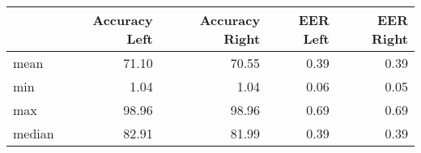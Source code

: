 \begin{tabular}{lrrrr}
\toprule
{} &  Accuracy Left &  Accuracy Right &  EER Left &  EER Right \\
\midrule
mean   &          71.10 &           70.55 &      0.39 &       0.39 \\
min    &           1.04 &            1.04 &      0.06 &       0.05 \\
max    &          98.96 &           98.96 &      0.69 &       0.69 \\
median &          82.91 &           81.99 &      0.39 &       0.39 \\
\bottomrule
\end{tabular}
